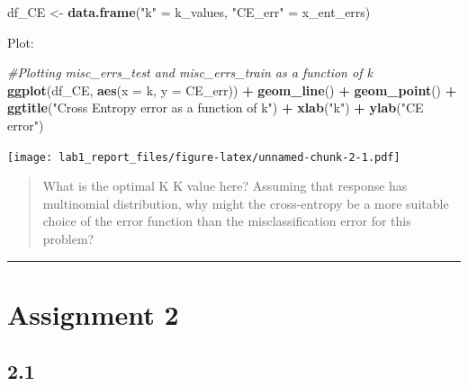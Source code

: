 \documentclass[
]{article}
\newenvironment{Shaded}{\begin{snugshade}}{\end{snugshade}}
\newcommand{\AttributeTok}[1]{\textcolor[rgb]{0.13,0.29,0.53}{#1}}
\newcommand{\CommentTok}[1]{\textcolor[rgb]{0.56,0.35,0.01}{\textit{#1}}}
\newcommand{\FunctionTok}[1]{\textcolor[rgb]{0.13,0.29,0.53}{\textbf{#1}}}
\newcommand{\NormalTok}[1]{#1}
\newcommand{\OtherTok}[1]{\textcolor[rgb]{0.56,0.35,0.01}{#1}}
\newcommand{\SpecialCharTok}[1]{\textcolor[rgb]{0.81,0.36,0.00}{\textbf{#1}}}
\newcommand{\StringTok}[1]{\textcolor[rgb]{0.31,0.60,0.02}{#1}}
\begin{document}
\begin{Shaded}
\begin{Highlighting}[]
\NormalTok{df\_CE }\OtherTok{\textless{}{-}} \FunctionTok{data.frame}\NormalTok{(}\StringTok{"k"} \OtherTok{=}\NormalTok{ k\_values, }\StringTok{"CE\_err"} \OtherTok{=}\NormalTok{ x\_ent\_errs)}
\end{Highlighting}
\end{Shaded}

Plot:

\begin{Shaded}
\begin{Highlighting}[]
\CommentTok{\#Plotting misc\_errs\_test and misc\_errs\_train as a function of k}
\FunctionTok{ggplot}\NormalTok{(df\_CE, }\FunctionTok{aes}\NormalTok{(}\AttributeTok{x =}\NormalTok{ k, }\AttributeTok{y =}\NormalTok{ CE\_err)) }\SpecialCharTok{+} \FunctionTok{geom\_line}\NormalTok{() }\SpecialCharTok{+} \FunctionTok{geom\_point}\NormalTok{() }\SpecialCharTok{+} \FunctionTok{ggtitle}\NormalTok{(}\StringTok{"Cross Entropy error as a function of k"}\NormalTok{) }\SpecialCharTok{+} \FunctionTok{xlab}\NormalTok{(}\StringTok{"k"}\NormalTok{) }\SpecialCharTok{+} \FunctionTok{ylab}\NormalTok{(}\StringTok{"CE error"}\NormalTok{)}
\end{Highlighting}
\end{Shaded}

\texttt{[image: lab1\_report\_files/figure-latex/unnamed-chunk-2-1.pdf]}

\begin{quote}
What is the optimal K K value here? Assuming that response has
multinomial distribution, why might the cross-entropy be a more suitable
choice of the error function than the misclassification error for this
problem?
\end{quote}

\begin{center}\rule{0.5\linewidth}{0.5pt}\end{center}

\hypertarget{assignment-2}{%
\section{Assignment 2}\label{assignment-2}}

\hypertarget{section-5}{%
\subsection{2.1}\label{section-5}}
\end{document}
